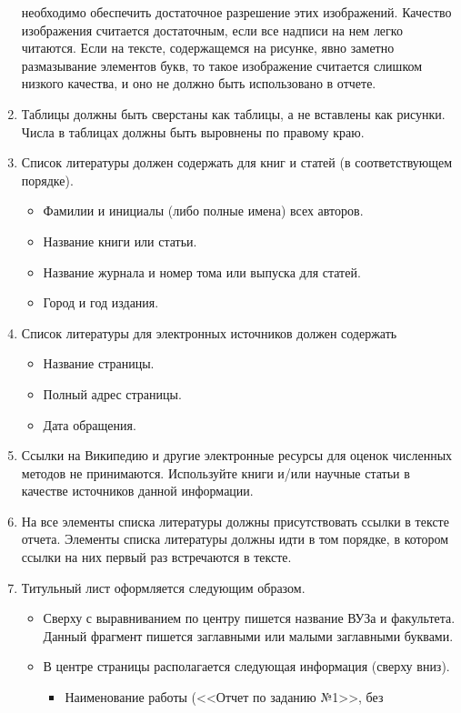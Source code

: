 \documentclass[a4paper,12pt,titlepage,draft]{article}
\begin{document}
\begin{enumerate}
	необходимо обеспечить достаточное разрешение этих изображений. Качество
	изображения считается достаточным, если все надписи на нем легко
	читаются. Если на тексте, содержащемся на рисунке, явно заметно
	размазывание элементов букв, то такое изображение считается слишком
	низкого качества, и оно не должно быть использовано в отчете.
    \item Таблицы должны быть сверстаны как таблицы, а не вставлены как рисунки.
	Числа в таблицах должны быть выровнены по правому краю.
    \item Список литературы должен содержать для книг и статей (в
	соответствующем порядке).
	\begin{itemize}
	    \item Фамилии и инициалы (либо полные имена) всех авторов.
	    \item Название книги или статьи.
	    \item Название журнала и номер тома или выпуска для статей.
	    \item Город и год издания.
	\end{itemize}
    \item Список литературы для электронных источников должен содержать
	\begin{itemize}
	    \item Название страницы.
	    \item Полный адрес страницы.
	    \item Дата обращения.
	\end{itemize}
    \item Ссылки на Википедию и другие электронные ресурсы для оценок численных
	методов не принимаются. Используйте книги и/или научные статьи в
	качестве источников данной информации.
    \item На все элементы списка литературы должны присутствовать ссылки в
	тексте отчета. Элементы списка литературы должны идти в том порядке, в
	котором ссылки на них первый раз встречаются в тексте.
    \item Титульный лист оформляется следующим образом.
	\begin{itemize}
	    \item Сверху с выравниванием по центру пишется название ВУЗа и
		факультета. Данный фрагмент пишется заглавными или малыми
		заглавными буквами.
	    \item В центре страницы располагается следующая информация (сверху вниз).
		\begin{itemize}
		    \item Наименование работы (<<Отчет по заданию №1>>, без

\end{itemize}
\end{itemize}
\end{enumerate}
\end{document}
